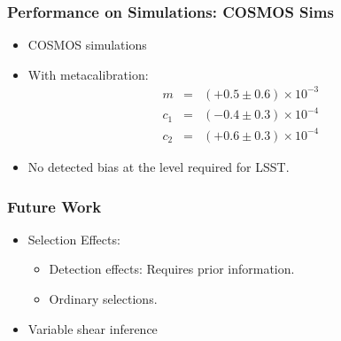 \documentclass{beamer}
\newcommand{\mcal}{metacalibration}
\begin{document}
\frame
{
    \frametitle{Performance on Simulations: COSMOS Sims}

 
    \begin{itemize}
            
            

         \item COSMOS simulations


         \item With \mcal:
        {\color{gold} 
            \begin{eqnarray}
                m & = & (+0.5 \pm 0.6) \times 10^{-3} \nonumber \\
              c_1 & = & (-0.4 \pm 0.3) \times 10^{-4} \nonumber \\
              c_2 & = & (+0.6 \pm 0.3) \times 10^{-4} \nonumber
            \end{eqnarray}
        }
         \item No detected bias at the level required for LSST.
    \end{itemize}

}



\frame
{
    \frametitle{Future Work}

 
    \begin{itemize}
            

         \item Selection Effects:
             \begin{itemize}
                 \item Detection effects:  Requires prior information.
                 \item Ordinary selections.  
             \end{itemize}

         \item Variable shear inference

    \end{itemize}

}
\end{document}
